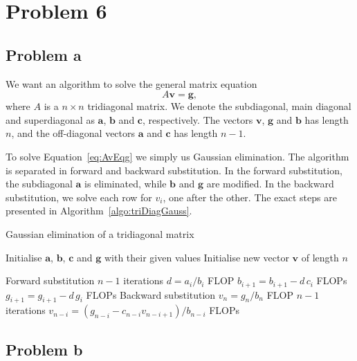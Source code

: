 \documentclass[english,notitlepage,aps,pra,10pt]{revtex4-2}
\newcommand{\bv}[1]{\mathbf{#1}}
\begin{document}
\section*{Problem 6}
\subsection*{Problem a}
We want an algorithm to solve the general matrix equation 
\begin{equation}
    A \bv{v} = \bv{g},
    \label{eq:AvEqg}
\end{equation}
where $A$ is a $n \times n$ tridiagonal matrix. We denote the subdiagonal, main diagonal and superdiagonal as $\bv{a}$, $\bv{b}$ and $\bv{c}$, respectively. The vectors $\bv{v}$, $\bv{g}$ and $\bv{b}$ has length $n$, and the off-diagonal vectors $\bv{a}$ and $\bv{c}$ has length $n-1$. 

To solve Equation~\ref{eq:AvEqg} we simply us Gaussian elimination. The algorithm is separated in forward and backward substitution. In the forward substitution, the subdiagonal $\bv{a}$ is eliminated, while $\bv{b}$ and $\bv{g}$ are modified. In the backward substitution, we solve each row for $v_i$, one after the other. The exact steps are presented in Algorithm~\ref{algo:triDiagGauss}.

\begin{algorithm}[H]
    \caption{Gaussian elimination of a tridiagonal matrix}\label{algo:triDiagGauss}
    \begin{algorithmic}
        \State Initialise $\bv{a}$, $\bv{b}$, $\bv{c}$ and $\bv{g}$ with their given values
        \State Initialise new vector $\bv{v}$ of length $n$ 

        \Comment Forward substitution
                            \Comment $n-1$ iterations
            \State $d = a_i/b_i$                         FLOP
            \State $b_{i+1} = b_{i+1} - d\, c_i$         FLOPs 
            \State $g_{i+1} = g_{i+1} - d\, g_i$         FLOPs 
        \EndFor
        \Comment Backward substitution
        \State $v_n = g_n/b_n$                           FLOP 
                            \Comment $n-1$ iterations
            \State $v_{n-i} = (g_{n-i} - c_{n-i} v_{n-i+1})/b_{n-i}$   FLOPs
        \EndFor
    \end{algorithmic}
\end{algorithm}

\subsection*{Problem b}
\end{document}
